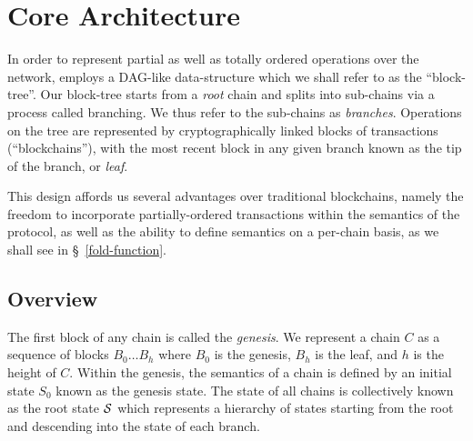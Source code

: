 \section{Core Architecture}


In order to represent partial as well as totally ordered operations over the
network, \oscoin{} employs a DAG-like data-structure which we shall refer to as
the ``block-tree''.  Our block-tree starts from a \emph{root} chain and splits
into sub-chains via a process called branching. We thus refer to the sub-chains as
\emph{branches}.  Operations on the tree are represented by cryptographically
linked blocks of transactions (``blockchains''), with the most recent block in
any given branch known as the tip of the branch, or \emph{leaf}.

This design affords us several advantages over traditional blockchains, namely
the freedom to incorporate partially-ordered transactions within the semantics
of the protocol, as well as the ability to define semantics on a per-chain
basis, as we shall see in \S~\ref{fold-function}.




\subsection{Overview}

The first block of any chain is called the \emph{genesis}. We represent a chain
$C$ as a sequence of blocks $B_0 \dots B_h$ where $B_0$ is the genesis,
$B_h$ is the leaf, and $h$ is the height of $C$. Within the genesis, the
semantics of a chain is defined by an initial state $S_0$ known as the
genesis state. The state of all chains is collectively known as the root state
$\mathcal{S}$ which represents a hierarchy of states starting from the root
and descending into the state of each branch.

